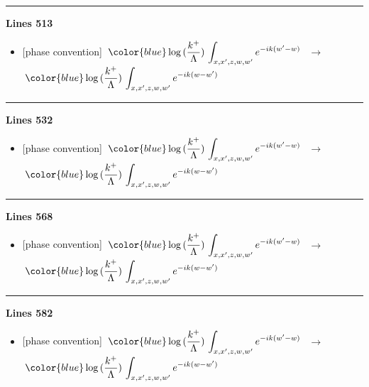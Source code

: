 \documentclass[10pt]{article}
\begin{document}
\noindent\rule{\linewidth}{0.3pt}\par\noindent\textbf{Lines 513} \par
\begin{itemize}[leftmargin=2.2em,itemsep=1pt,topsep=2pt]
\item[\textbf{l.513}] \textsf{\small [phase convention]} $\displaystyle \,{\color{blue}\log{(\frac{k^{+}}{\Lambda})}}\,\int_{x,x',z,w,w'}e^{-ik(w'-w)}\,$\ $\longrightarrow$\ $\displaystyle \,{\color{blue}\log{(\frac{k^{+}}{\Lambda})}}\,\int_{x,x',z,w,w'}e^{-ik(w-w')}\,$
\end{itemize}
\noindent\rule{\linewidth}{0.3pt}\par\noindent\textbf{Lines 532} \par
\begin{itemize}[leftmargin=2.2em,itemsep=1pt,topsep=2pt]
\item[\textbf{l.532}] \textsf{\small [phase convention]} $\displaystyle \,{\color{blue}\log{(\frac{k^{+}}{\Lambda})}}\,\int_{x,x',z,w,w'}e^{-ik(w'-w)}\,$\ $\longrightarrow$\ $\displaystyle \,{\color{blue}\log{(\frac{k^{+}}{\Lambda})}}\,\int_{x,x',z,w,w'}e^{-ik(w-w')}\,$
\end{itemize}
\noindent\rule{\linewidth}{0.3pt}\par\noindent\textbf{Lines 568} \par
\begin{itemize}[leftmargin=2.2em,itemsep=1pt,topsep=2pt]
\item[\textbf{l.568}] \textsf{\small [phase convention]} $\displaystyle \,{\color{blue}\log{(\frac{k^{+}}{\Lambda})}}\,\int_{x,x',z,w,w'}e^{-ik(w'-w)}\,$\ $\longrightarrow$\ $\displaystyle \,{\color{blue}\log{(\frac{k^{+}}{\Lambda})}}\,\int_{x,x',z,w,w'}e^{-ik(w-w')}\,$
\end{itemize}
\noindent\rule{\linewidth}{0.3pt}\par\noindent\textbf{Lines 582} \par
\begin{itemize}[leftmargin=2.2em,itemsep=1pt,topsep=2pt]
\item[\textbf{l.582}] \textsf{\small [phase convention]} $\displaystyle \,{\color{blue}\log{(\frac{k^{+}}{\Lambda})}}\,\int_{x,x',z,w,w'}e^{-ik(w'-w)}\,$\ $\longrightarrow$\ $\displaystyle \,{\color{blue}\log{(\frac{k^{+}}{\Lambda})}}\,\int_{x,x',z,w,w'}e^{-ik(w-w')}\,$
\end{itemize}
\end{document}
